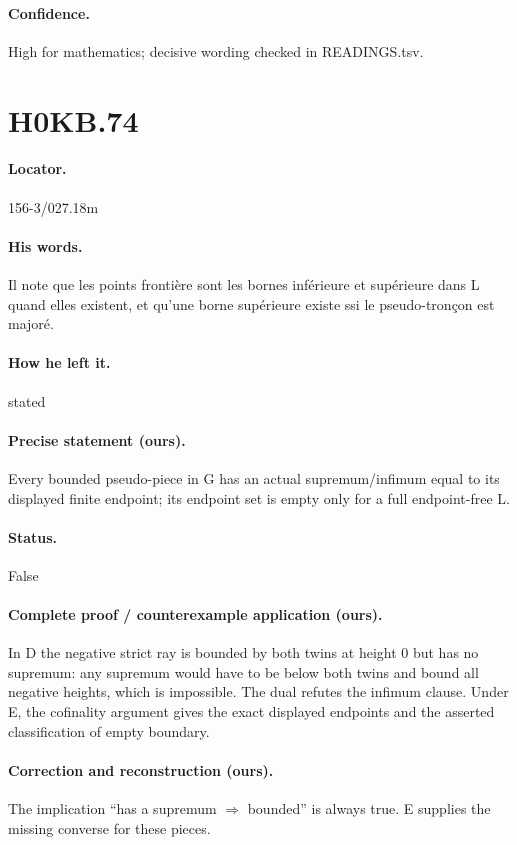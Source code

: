 \paragraph{Confidence.} High for mathematics; decisive wording checked in READINGS.tsv.

\section*{H0KB.74}\label{statement:H0KB.74}
\paragraph{Locator.} 156-3/027.18m

\paragraph{His words.} Il note que les points frontière sont les bornes inférieure et supérieure dans L quand elles existent, et qu’une borne supérieure existe ssi le pseudo-tronçon est majoré.

\paragraph{How he left it.} stated

\paragraph{Precise statement (ours).} Every bounded pseudo-piece in G has an actual supremum/infimum equal to its displayed finite endpoint; its endpoint set is empty only for a full endpoint-free L.

\paragraph{Status.} False

\paragraph{Complete proof / counterexample application (ours).} In D the negative strict ray is bounded by both twins at height 0 but has no supremum: any supremum would have to be below both twins and bound all negative heights, which is impossible. The dual refutes the infimum clause. Under E, the cofinality argument gives the exact displayed endpoints and the asserted classification of empty boundary.

\paragraph{Correction and reconstruction (ours).} The implication “has a supremum \ensuremath{\Rightarrow} bounded” is always true. E supplies the missing converse for these pieces.

